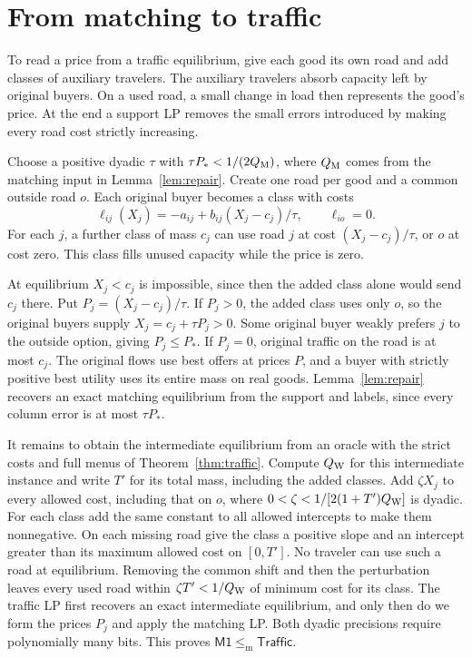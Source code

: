 \documentclass[11pt]{article}
\newcommand{\Market}{\mathsf{M1}}
\newcommand{\Traffic}{\mathsf{Traffic}}
\newcommand{\dd}{\mathrel{\leq_{\mathrm m}}}
\begin{document}
\section{From matching to traffic}\label{sec:forward}


To read a price from a traffic equilibrium, give each good its own road
and add classes of auxiliary travelers. The auxiliary travelers absorb
capacity left by original buyers. On a used road, a small change in load
then represents the good's price. At the end a support LP removes the
small errors introduced by making every road cost strictly increasing.

Choose a positive dyadic \(\tau\) with \(\tau P_*<1/(2Q_{\rm M})\),
where \(Q_{\rm M}\) comes from the matching input in Lemma~\ref{lem:repair}.
Create one road per good and a common outside road \(o\). Each original
buyer becomes a class with costs
\[
 \ell_{ij}(X_j)=-a_{ij}+b_{ij}(X_j-c_j)/\tau,\qquad \ell_{io}=0 .
\]
For each \(j\), a further class of mass \(c_j\) can use road \(j\) at cost
\((X_j-c_j)/\tau\), or \(o\) at cost zero. This class fills unused capacity
while the price is zero.

At equilibrium \(X_j<c_j\) is impossible, since then the added class alone
would send \(c_j\) there. Put \(P_j=(X_j-c_j)/\tau\). If \(P_j>0\), the
added class uses only \(o\), so the original buyers supply
\(X_j=c_j+\tau P_j>0\). Some original buyer weakly prefers \(j\) to the
outside option, giving \(P_j\le P_*\). If \(P_j=0\), original traffic on
the road is at most \(c_j\). The original flows use best offers at prices
\(P\), and a buyer with strictly positive best utility uses its entire mass
on real goods. Lemma~\ref{lem:repair} recovers an exact matching equilibrium
from the support and labels, since every column error is at most \(\tau P_*\).

It remains to obtain the intermediate equilibrium from an oracle with the
strict costs and full menus of Theorem~\ref{thm:traffic}. Compute
\(Q_{\rm W}\) for this intermediate instance and write \(T'\) for its total
mass, including the added classes. Add \(\zeta X_j\) to every allowed cost,
including that on \(o\), where \(0<\zeta<1/[2(1+T')Q_{\rm W}]\) is dyadic.
For each class add the same constant to all allowed intercepts to make them
nonnegative. On each missing road give the class a positive slope and an
intercept greater than its maximum allowed cost on \([0,T']\). No traveler
can use such a road at equilibrium. Removing the common shift and then the
perturbation leaves every used road within \(\zeta T'<1/Q_{\rm W}\) of
minimum cost for its class. The traffic LP first recovers an exact
intermediate equilibrium, and only then do we form the prices \(P_j\) and
apply the matching LP. Both dyadic precisions require polynomially many
bits. This proves \(\Market\dd\Traffic\).
\end{document}
